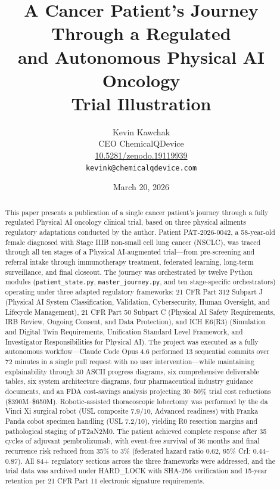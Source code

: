 \documentclass{article}
\title{A Cancer Patient's Journey Through a Regulated\\and Autonomous Physical AI Oncology\\Trial Illustration}
\author{
  Kevin Kawchak\hspace{2pt}\orcidicon{0009-0007-5457-8667} \\
  CEO ChemicalQDevice\\
  \href{https://doi.org/10.5281/zenodo.19119939}{10.5281/zenodo.19119939} \\
  \texttt{kevink@chemicalqdevice.com}
}
\date{March 20, 2026}
\begin{document}
\maketitle

\begin{abstract}
This paper presents a publication of a single cancer patient's journey through a fully regulated Physical AI oncology clinical trial, based on three physical ailments regulatory adaptations conducted by the author. Patient PAT-2026-0042, a 58-year-old female diagnosed with Stage IIIB non-small cell lung cancer (NSCLC), was traced through all ten stages of a Physical AI-augmented trial---from pre-screening and referral intake through immunotherapy treatment, federated learning, long-term surveillance, and final closeout. The journey was orchestrated by twelve Python modules (\texttt{patient\_state.py}, \texttt{master\_journey.py}, and ten stage-specific orchestrators) operating under three adapted regulatory frameworks: 21 CFR Part 312 Subpart J (Physical AI System Classification, Validation, Cybersecurity, Human Oversight, and Lifecycle Management), 21 CFR Part 50 Subpart C (Physical AI Safety Requirements, IRB Review, Ongoing Consent, and Data Protection), and ICH E6(R3) (Simulation and Digital Twin Requirements, Unification Standard Level Framework, and Investigator Responsibilities for Physical AI). The project was executed as a fully autonomous workflow---Claude Code Opus 4.6 performed 13 sequential commits over 72 minutes in a single pull request with no user intervention---while maintaining explainability through 30 ASCII progress diagrams, six comprehensive deliverable tables, six system architecture diagrams, four pharmaceutical industry guidance documents, and an FDA cost-savings analysis projecting 30--50\% trial cost reductions (\$390M--\$650M). Robotic-assisted thoracoscopic lobectomy was performed by the da Vinci Xi surgical robot (USL composite 7.9/10, Advanced readiness) with Franka Panda cobot specimen handling (USL 7.2/10), yielding R0 resection margins and pathological staging of pT2aN2M0. The patient achieved complete response after 35 cycles of adjuvant pembrolizumab, with event-free survival of 36 months and final recurrence risk reduced from 35\% to 3\% (federated hazard ratio 0.62, 95\% CrI: 0.44--0.87). All 84+ regulatory sections across the three frameworks were addressed, and the trial data was archived under HARD\_LOCK with SHA-256 verification and 15-year retention per 21 CFR Part 11 electronic signature requirements.
\end{abstract}
\end{document}
